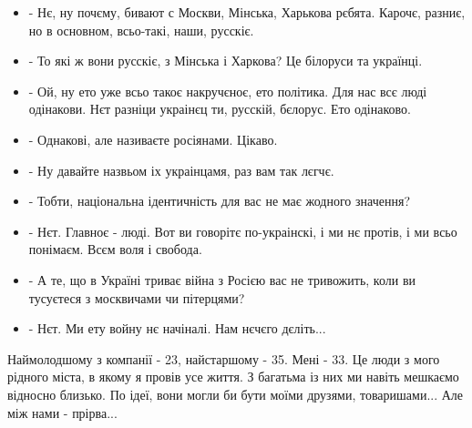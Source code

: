 \begin{itemize}
  \item - Нє, ну почєму, бивают с Москви, Мінська, Харькова рєбята. Карочє, разниє, но в основном, всьо-такі, наши, русскіє.
  \item - То які ж вони русскіє, з Мінська і Харкова? Це білоруси та українці.
  \item - Ой, ну ето уже всьо такоє накручєноє, ето політика. Для нас всє люді одінакови. Нєт разніци украінєц ти, русскій, бєлорус. Ето одінаково.
  \item - Однакові, але називаєте росіянами. Цікаво.
  \item - Ну давайте назвьом іх украінцамя, раз вам так лєгчє.
  \item - Тобти, національна ідентичність для вас не має жодного значення?
  \item - Нєт. Главноє - люді. Вот ви говорітє по-украінскі, і ми нє протів, і ми всьо понімаєм. Всєм воля і свобода.
  \item - А те, що в Україні триває війна з Росією вас не тривожить, коли ви тусуєтеся з москвичами чи пітерцями?
  \item - Нєт. Ми ету войну нє начіналі. Нам нєчєго дєліть...
\end{itemize}

Наймолодшому з компанії - 23, найстаршому - 35. Мені - 33. Це люди з мого
рідного міста, в якому я провів усе життя. З багатьма із них ми навіть мешкаємо
відносно близько. По ідеї, вони могли би бути моїми друзями, товаришами... Але
між нами - прірва...

